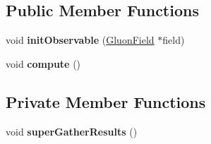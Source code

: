 \subsection*{Public Member Functions}
\begin{DoxyCompactItemize}
\item 
void {\bfseries init\+Observable} (\hyperlink{field_8h_afe80b127697eba6d6e7fbd8121c8d4ee}{Gluon\+Field} $\ast$field)\hypertarget{classSuperObs_a292660868f04e6afc8c1300ec6fca5cc}{}\label{classSuperObs_a292660868f04e6afc8c1300ec6fca5cc}

\item 
void {\bfseries compute} ()\hypertarget{classSuperObs_a84e5e240fca5bdab31046fa87805456d}{}\label{classSuperObs_a84e5e240fca5bdab31046fa87805456d}

\end{DoxyCompactItemize}
\subsection*{Private Member Functions}
\begin{DoxyCompactItemize}
\item 
void {\bfseries super\+Gather\+Results} ()\hypertarget{classSuperObs_a24f0e5e87655af0c44d041fc332db1e7}{}\label{classSuperObs_a24f0e5e87655af0c44d041fc332db1e7}

\end{DoxyCompactItemize}
